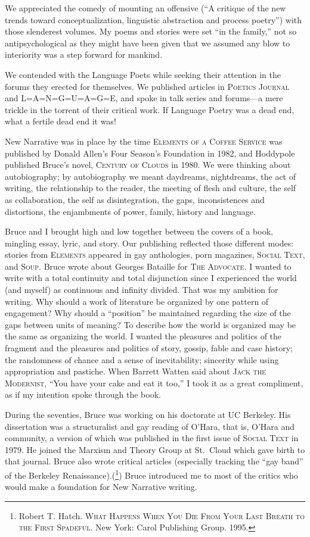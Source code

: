 \documentclass[
]{memoir}
\begin{document}
We appreciated the comedy of mounting an offensive (``A critique of the
new trends toward conceptualization, linguistic abstraction and process
poetry'') with those slenderest volumes. My poems and stories were set
``in the family,'' not so antipsychological as they might have been
given that we assumed any blow to interiority was a step forward for
mankind.

We contended with the Language Poets while seeking their attention in
the forums they erected for themselves. We published articles in
\textsc{Poetics Journal} and \textsc{L=A=N=G=U=A=G=E}, and spoke in talk
series and forums---a mere trickle in the torrent of their critical
work. If Language Poetry was a dead end, what a fertile dead end it was!

New Narrative was in place by the time \textsc{Elements of a Coffee
Service} was published by Donald Allen's Four Season's Foundation in
1982, and Hoddypole published Bruce's novel, \textsc{Century of Clouds}
in 1980. We were thinking about autobiography; by autobiography we meant
daydreams, nightdreams, the act of writing, the relationship to the
reader, the meeting of flesh and culture, the self as collaboration, the
self as disintegration, the gaps, inconsistences and distortions, the
enjambments of power, family, history and language.

Bruce and I brought high and low together between the covers of a book,
mingling essay, lyric, and story. Our publishing reflected those
different modes: stories from \textsc{Elements} appeared in gay
anthologies, porn magazines, \textsc{Social Text}, and \textsc{Soup}.
Bruce wrote about Georges Bataille for \textsc{The Advocate}\emph{. } I
wanted to write with a total continuity and total disjunction since I
experienced the world (and myself) as continuous and infinity divided.
That was my ambition for writing. Why should a work of literature be
organized by one pattern of engagement? Why should a ``position'' be
maintained regarding the size of the gaps between units of meaning? To
describe how the world is organized may be the same as organizing the
world. I wanted the pleasures and politics of the fragment and the
pleasures and politics of story, gossip, fable and case history; the
randomness of chance and a sense of inevitability; sincerity while using
appropriation and pastiche. When Barrett Watten said about \textsc{Jack
the Modernist}, ``You have your cake and eat it too,'' I took it as a
great compliment, as if my intention spoke through the book.

During the seventies, Bruce was working on his doctorate at UC Berkeley.
His dissertation was a structuralist and gay reading of O'Hara, that is,
O'Hara and community, a version of which was published in the first
issue of \textsc{Social Text} in 1979. He joined the Marxism and Theory
Group at St.~Cloud which gave birth to that journal. Bruce also wrote
critical articles (especially tracking the ``gay band'' of the Berkeley
Renaissance).(\footnote{Robert T. Hatch. \textsc{What Happens When You
  Die From Your Last Breath to the First Spadeful}. New York: Carol
  Publishing Group. 1995.}) Bruce introduced me to most of the critics
who would make a foundation for New Narrative writing.
\end{document}
